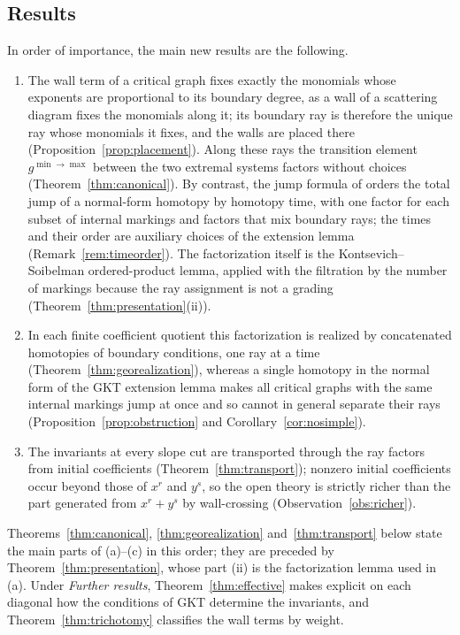 \documentclass[11pt]{amsart}
\theoremstyle{definition}
\theoremstyle{remark}
\begin{document}
\subsection{Results}
\label{ssec:results}
In order of importance, the main new results are the following.
\begin{enumerate}
\item[(a)] The wall term of a critical graph fixes exactly the monomials whose
exponents are proportional to its boundary degree, as a wall of a scattering
diagram fixes the monomials along it; its boundary ray is therefore the unique
ray whose monomials it fixes, and the walls are placed there
(Proposition~\ref{prop:placement}).  Along these rays the transition element
$g^{\min\to\max}$ between the two extremal systems factors without choices
(Theorem~\ref{thm:canonical}).  By contrast, the jump formula of \cite[proof of Thm.~5.9]{GKT} orders the total jump of a normal-form homotopy by homotopy time, with one
factor for each subset of internal markings and factors that mix boundary
rays; the times and their order are auxiliary choices of the extension lemma
(Remark~\ref{rem:timeorder}).  The factorization itself is the
Kontsevich--Soibelman ordered-product lemma, applied with the filtration by
the number of markings because the ray assignment is not a grading
(Theorem~\ref{thm:presentation}(ii)).
\item[(b)] In each finite coefficient quotient this factorization is realized
by concatenated homotopies of boundary conditions, one ray at a time
(Theorem~\ref{thm:georealization}), whereas a single homotopy in the normal
form of the GKT extension lemma makes all critical graphs with the same internal
markings jump at once and so cannot in general separate their rays
(Proposition~\ref{prop:obstruction} and Corollary~\ref{cor:nosimple}).
\item[(c)] The invariants at every slope cut are transported through the ray
factors from initial coefficients (Theorem~\ref{thm:transport}); nonzero
initial coefficients occur beyond those of $x^r$ and $y^s$, so the open theory
is strictly richer than the part generated from $x^r+y^s$ by wall-crossing
(Observation~\ref{obs:richer}).
\end{enumerate}
Theorems~\ref{thm:canonical}, \ref{thm:georealization} and~\ref{thm:transport}
below state the main parts of (a)--(c) in this order; they are preceded by
Theorem~\ref{thm:presentation}, whose part (ii) is the factorization lemma
used in (a).  Under \emph{Further results}, Theorem~\ref{thm:effective} makes
explicit on each diagonal how the conditions of GKT determine the invariants,
and Theorem~\ref{thm:trichotomy} classifies the wall terms by weight.
\end{document}
